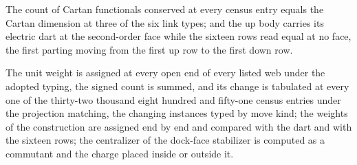 \begin{chwall}\label{box:IV-4-cartan-weights-and-the-charge:5}
The count of Cartan functionals conserved at every census entry equals the Cartan dimension at three of the six link types; and the up body carries its electric dart at the second-order face while the sixteen rows read equal at no face, the first parting moving from the first up row to the first down row.
\end{chwall}
The unit weight is assigned at every open end of every listed web under the adopted typing, the signed count is summed, and its change is tabulated at every one of the thirty-two thousand eight hundred and fifty-one census entries under the projection matching, the changing instances typed by move kind; the weights of the construction are assigned end by end and compared with the dart and with the sixteen rows; the centralizer of the dock-face stabilizer is computed as a commutant and the charge placed inside or outside it.

